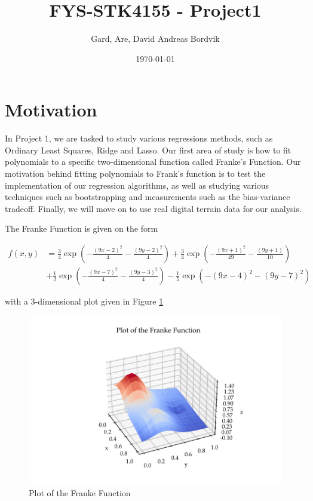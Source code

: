 \documentclass[11pt, a4paper]{article}
\title{FYS-STK4155 - Project1}
\author{Gard, Are, David Andreas Bordvik}
\date{\today}
\begin{document}
\maketitle

\section*{Motivation}
In Project 1, we are tasked to study various regressions methods, such as Ordinary Least Squares, Ridge and Lasso. Our first area of study is how to fit polynomials to a specific two-dimensional function called Franke's Function. Our motivation behind fitting polynomials to Frank's function is to test the implementation of our regression algorithms, as well as studying various techniques such as bootstrapping and measurements such as the bias-variance tradeoff. Finally, we will move on to use real digital terrain data for our analysis.

The Franke Function is given on the form

\begin{align*}
  f(x,y) & = \frac{3}{4}\exp{\left(-\frac{(9x-2)^2}{4} - \frac{(9y-2)^2}{4}\right)}+\frac{3}{4}\exp{\left(-\frac{(9x+1)^2}{49}- \frac{(9y+1)}{10}\right)} \\
         & +\frac{1}{2}\exp{\left(-\frac{(9x-7)^2}{4} - \frac{(9y-3)^2}{4}\right)} -\frac{1}{5}\exp{\left(-(9x-4)^2 - (9y-7)^2\right) }
\end{align*}

with a 3-dimensional plot given in Figure \ref{fig:1}

\begin{figure}[h]
  \centering
  \includegraphics[scale=0.75]{figures/EX1_franke_function_nonoise_preview.pdf}
  \caption{\label{fig:1}Plot of the Franke Function}
\end{figure}
\end{document}
